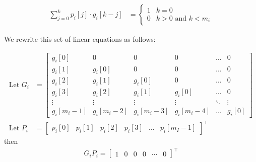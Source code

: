 \documentclass{article}
\begin{document}
\begin{align}
    \sum_{j=0}^{k} p_i[j]\cdot g_i[k-j] &= \begin{cases} 1 & k = 0\\ 0 & k>0 \textrm{ and } k<m_i\end{cases}
\end{align}

We rewrite this set of linear equations as follows:

\begin{align}
    \textrm{Let } G_i &= 
        \begin{bmatrix}
            g_i[0] & 0 & 0 & 0 & \dots  & 0 \\
            g_i[1] & g_i[0] & 0 & 0 &\dots  & 0 \\
            g_i[2] & g_i[1] & g_i[0] & 0 & \dots  & 0 \\
            g_i[3] & g_i[2] & g_i[1] & g_i[0] & \dots  & 0 \\
            \vdots & \vdots & \vdots & \vdots & \ddots & \vdots \\
            g_i[m_i-1] & g_i[m_i-2] & g_i[m_i-3] & g_i[m_i-4] & \dots  & g_i[0]
        \end{bmatrix}\\
    \textrm{Let } P_i &= 
        \begin{bmatrix}
            p_i[0] & p_i[1] & p_i[2] & p_i[3] & \dots  & p_i[m_I-1]
        \end{bmatrix}^{\top}
\end{align}
then
\begin{align}
    G_iP_i = \begin{bmatrix}
            1 & 0 & 0 & 0 & \cdots & 0
        \end{bmatrix}^{\top} \label{linear-eq}
\end{align}
\end{document}
